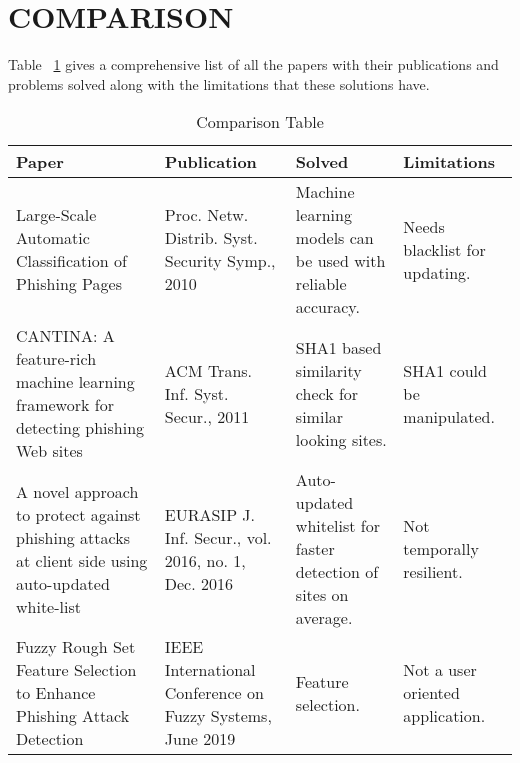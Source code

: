 \section{COMPARISON}
Table ~\ref{tab:ct} gives a comprehensive list of all the papers with their publications and problems solved along with the limitations that these solutions have.

\begin{table}[h!]
\centering
    \begin{tabular}{ |m{3cm}|m{3cm}|m{4cm}|m{4cm}| }
    \hline
    Paper & Publication & Solved & Limitations \\ \hline
    Large-Scale Automatic Classification of Phishing Pages & Proc. Netw. Distrib. Syst. Security Symp., 2010 & Machine learning models can be used with reliable accuracy. & Needs blacklist for updating. \\ \hline
    CANTINA: A feature-rich machine learning framework for detecting phishing Web sites & ACM Trans. Inf. Syst. Secur., 2011 & SHA1 based similarity check for similar looking sites. & SHA1 could be manipulated. \\ \hline
    A novel approach to protect against phishing attacks at client side using auto-updated white-list & EURASIP J. Inf. Secur., vol. 2016, no. 1, Dec. 2016 & Auto-updated whitelist for faster detection of sites on average. & Not temporally resilient. \\ \hline
    Fuzzy Rough Set Feature Selection to Enhance Phishing Attack Detection & IEEE International Conference on Fuzzy Systems, June 2019 & Feature selection. & Not a user oriented application. \\ \hline
    \end{tabular}
\caption{Comparison Table}
\label{tab:ct}
\end{table}